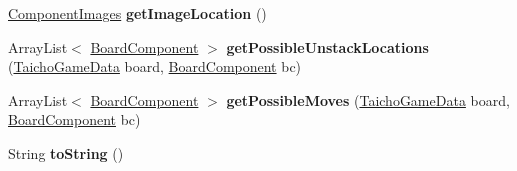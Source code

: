 \begin{DoxyCompactItemize}
\item 
\hypertarget{classbasecomponents_1_1_movable_object_aadc306c7e12f0e466ca1e741daf63267}{\hyperlink{enumenums_1_1_component_images}{Component\-Images} {\bfseries get\-Image\-Location} ()}\label{classbasecomponents_1_1_movable_object_aadc306c7e12f0e466ca1e741daf63267}

\item 
\hypertarget{classbasecomponents_1_1_movable_object_a25f5415ea8578bbef9d94804d8aca806}{Array\-List$<$ \hyperlink{classbasecomponents_1_1_board_component}{Board\-Component} $>$ {\bfseries get\-Possible\-Unstack\-Locations} (\hyperlink{classgameparts_1_1_taicho_game_data}{Taicho\-Game\-Data} board, \hyperlink{classbasecomponents_1_1_board_component}{Board\-Component} bc)}\label{classbasecomponents_1_1_movable_object_a25f5415ea8578bbef9d94804d8aca806}

\item 
\hypertarget{classbasecomponents_1_1_movable_object_a67ea209cc160fccebbddbe7fd7a245be}{Array\-List$<$ \hyperlink{classbasecomponents_1_1_board_component}{Board\-Component} $>$ {\bfseries get\-Possible\-Moves} (\hyperlink{classgameparts_1_1_taicho_game_data}{Taicho\-Game\-Data} board, \hyperlink{classbasecomponents_1_1_board_component}{Board\-Component} bc)}\label{classbasecomponents_1_1_movable_object_a67ea209cc160fccebbddbe7fd7a245be}

\item 
\hypertarget{classbasecomponents_1_1_movable_object_a0aa0a460f25d243fa2cf8ffe34c0a2eb}{String {\bfseries to\-String} ()}\label{classbasecomponents_1_1_movable_object_a0aa0a460f25d243fa2cf8ffe34c0a2eb}

\end{DoxyCompactItemize}
